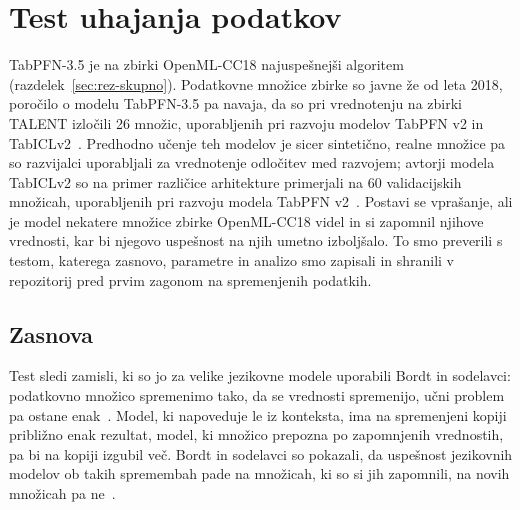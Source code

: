 \documentclass[a4paper,12pt,openright]{book}
\begin{document}
\section{Test uhajanja podatkov}
\label{sec:rez-uhajanje}

TabPFN-3.5 je na zbirki OpenML-CC18 najuspešnejši algoritem
(razdelek~\ref{sec:rez-skupno}). Podatkovne množice zbirke so javne že od leta
2018, poročilo o modelu TabPFN-3.5 pa navaja, da so pri vrednotenju na zbirki
TALENT izločili 26 množic, uporabljenih pri razvoju modelov TabPFN v2 in
TabICLv2~\cite{jager2026tabpfn35}. Predhodno učenje teh modelov je sicer
sintetično, realne množice pa so razvijalci uporabljali za vrednotenje
odločitev med razvojem; avtorji modela TabICLv2 so na primer različice
arhitekture primerjali na 60 validacijskih množicah, uporabljenih pri razvoju
modela TabPFN v2~\cite{qu2026tabiclv2}.
Postavi se vprašanje, ali je model
nekatere množice zbirke OpenML-CC18 videl in si zapomnil njihove vrednosti, kar
bi njegovo uspešnost na njih umetno izboljšalo. To smo preverili s testom,
katerega zasnovo, parametre in analizo smo zapisali in shranili v repozitorij
pred prvim zagonom na spremenjenih podatkih.

\subsection{Zasnova}

Test sledi zamisli, ki so jo za velike jezikovne modele uporabili Bordt in
sodelavci: podatkovno množico spremenimo tako, da se vrednosti spremenijo,
učni problem pa ostane enak~\cite{bordt2024elephants}. Model, ki napoveduje le
iz konteksta, ima na spremenjeni kopiji približno enak rezultat, model, ki
množico prepozna po zapomnjenih vrednostih, pa bi na kopiji izgubil več.
Bordt in sodelavci so pokazali, da uspešnost jezikovnih modelov ob takih
spremembah pade na množicah, ki so si jih zapomnili, na novih množicah pa
ne~\cite{bordt2024elephants}.
\end{document}
